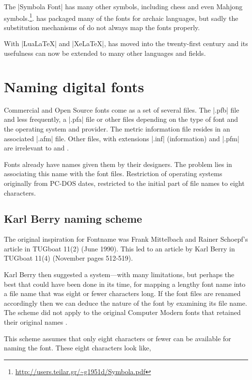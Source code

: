 The |Symbola Font| has many other symbols, including chess and even Mahjong symbols.\footnote{\url{http://users.teilar.gr/~g1951d/Symbola.pdf}}.  has packaged many of the fonts for archaic languages, but sadly the substitution mechanisms of \latexe do not always map the fonts properly.

With |LuaLaTeX| and |XeLaTeX|, \tex has moved into the twenty-first century and its usefulness can now be extended to many other languages and fields. 

\section{Naming digital fonts}

Commercial and Open Source fonts come as a set of several files. The |.pfb| file and less frequently, a |.pfa| file or other files depending on the type of font and the operating system and provider. The metric information file resides in an associated |.afm| file. Other files, with extensions |.inf| (information) and |.pfm| are irrelevant to \latex and \tex.

Fonts already have names given them by their designers. The problem lies in associating this name with the font files. Restriction of operating systems originally from PC-DOS dates, restricted to the initial part of file names to eight characters.

\subsection{Karl Berry naming scheme}

The original inspiration for Fontname was Frank Mittelbach and Rainer Schoepf's article in TUGboat 11(2) (June 1990). This led to an article by Karl Berry in TUGboat 11(4) (November pages 512-519).

Karl Berry then suggested a system---with many limitations, but perhaps the best that could have been done in its time, for mapping a lengthy font name into a file name that was eight or fewer characters long. If the font files are renamed accordingly then we can deduce the nature of the font by examining its file name. The scheme did not apply to the original Computer Modern fonts that retained their original names \citep{fontname}.

This scheme assumes that only eight characters or fewer can be available for naming the font. These eight characters look like,

